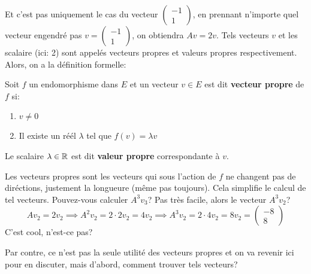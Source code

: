 \begin{center}
\end{center}
Et c'est pas uniquement le cas du vecteur $\begin{pmatrix} -1 \\ 1 \end{pmatrix} $, en prennant n'importe quel vecteur engendré pas $v = \begin{pmatrix} -1 \\ 1 \end{pmatrix} $, on obtiendra $Av = 2v$.
Tels vecteurs $v$ et les scalaire (ici: 2) sont appelés vecteurs propres et valeurs propres respectivement. Alors, on a la définition formelle:
\begin{definition}
    Soit $f$ un endomorphisme dans  $E$ et un vecteur  $v \in E$ est dit \textbf{vecteur propre} de $f$ si:
     \begin{enumerate}
        \item $v \neq 0$
        \item Il existe un réél $\lambda$ tel que  $f(v) = \lambda v$
    \end{enumerate}
    Le scalaire $\lambda \in \mathbb{R}$ est dit \textbf{valeur propre} correspondante à $v$.
\end{definition}
\begin{intuition}
   Les vecteurs propres sont les vecteurs qui sous l'action de $f$ ne changent pas de diréctions, justement la longueure (même pas toujours). Cela simplifie le calcul de tel vecteurs. Pouvez-vous calculer  $A^3v_3$? Pas très facile, alors le vecteur  $A^3v_2$? 
   \[
    Av_2 = 2v_2 \implies A^2v_2 = 2\cdot 2v_2 = 4v_2 \implies A^3v_2 = 2 \cdot 4v_2 = 8v_2 = \begin{pmatrix} -8 \\ 8 \end{pmatrix} 
   \] 
   C'est cool, n'est-ce pas?
\end{intuition}
Par contre, ce n'est pas la seule utilité des vecteurs propres et on va revenir ici pour en discuter, mais d'abord, comment trouver tels vecteurs?

